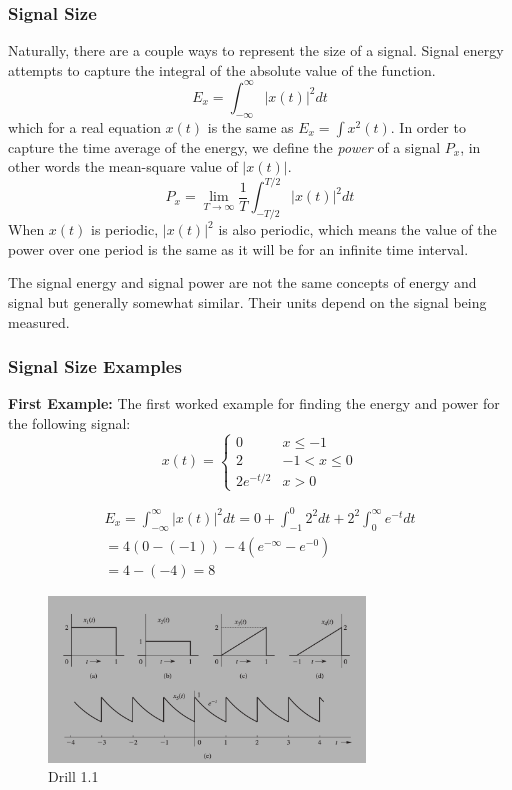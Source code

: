 \subsubsection{Signal Size}
Naturally, there are a couple ways to represent the size of a signal.
Signal energy attempts to capture the integral of the absolute value of the function.
\begin{equation}
    E_x = \int_{-\infty}^{\infty} |x(t)|^2 dt
\end{equation}
which for a real equation $x(t)$ is the same as $E_x = \int x^2 (t)$.
In order to capture the time average of the energy, we define the \textit{power} of a signal $P_x$, in other words the mean-square value of $|x(t)|$.
\begin{equation}
    P_x = \lim_{T \to \infty} \frac{1}{T} \int_{-T/2}^{T/2} |x(t)|^2 dt
\end{equation}
When $x(t)$ is periodic, $|x(t)|^2$ is also periodic, which means the value of the power over one period is the same as it will be for an infinite time interval.

The signal energy and signal power are not the same concepts of energy and signal but generally somewhat similar.
Their units depend on the signal being measured.
\subsubsection{Signal Size Examples}
\textbf{First Example: }
The first worked example for finding the energy and power for the following signal:
\begin{equation}
    x(t) = 
    \begin{cases}
        0 & x \leq -1 \\
        2 & -1 < x \leq  0 \\
        2e^{-t/2} & x > 0
    \end{cases}
\end{equation}

\begin{gather}
    E_x = \int_{-\infty}^{\infty} |x(t)|^2 dt = 0 + \int_{-1}^{0} 2^2 dt + 2^2\int_{0}^{\infty} e^{-t} dt \\
    = 4(0 - (-1)) -4 (e^{-\infty} - e^{-0}) \\
    = 4 - (-4) = 8
\end{gather}

\begin{figure}[htbp]
  \centerline{\includegraphics[width=0.75\textwidth]{../../images/sys_drill_1_1.png}}
  \caption{Drill 1.1}
  \label{fig:sys_drill_1_1}
\end{figure}

